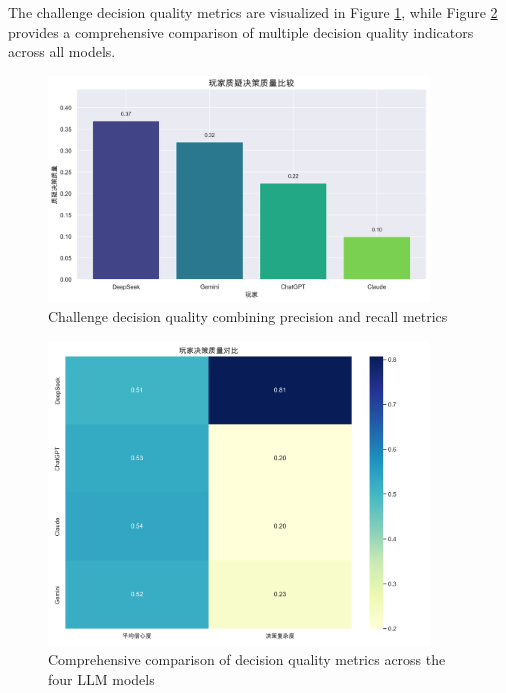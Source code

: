 \documentclass{article}
\begin{document}
The challenge decision quality metrics are visualized in Figure \ref{fig:challenge_quality}, while Figure \ref{fig:decision_quality_comparison} provides a comprehensive comparison of multiple decision quality indicators across all models.

\begin{figure}[H]
    \centering
    \includegraphics[width=0.9\textwidth]{figures/decision_challenge_decision_quality.png}
    \caption{Challenge decision quality combining precision and recall metrics}
    \label{fig:challenge_quality}
\end{figure}

\begin{figure}[H]
    \centering
    \includegraphics[width=0.9\textwidth]{figures/player_decision_quality_comparison.png}
    \caption{Comprehensive comparison of decision quality metrics across the four LLM models}
    \label{fig:decision_quality_comparison}
\end{figure}
\end{document}
